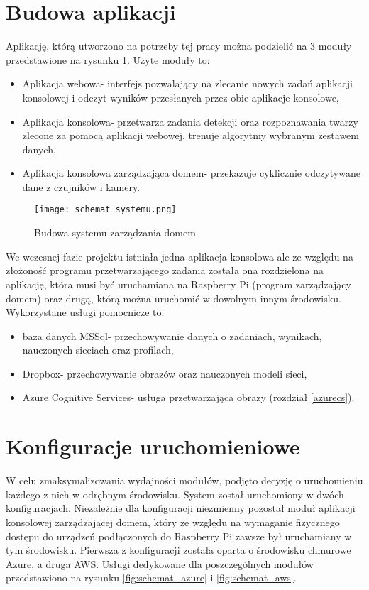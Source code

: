 \section{Budowa aplikacji}
Aplikację, którą utworzono na potrzeby tej pracy można podzielić na 3 moduły przedstawione na rysunku \ref{fig:schemat_systemu}. Użyte moduły to:
\begin{itemize}
\item Aplikacja webowa- interfejs pozwalający na zlecanie nowych zadań aplikacji konsolowej i odczyt wyników przesłanych przez obie aplikacje konsolowe,
\item Aplikacja konsolowa- przetwarza zadania detekcji oraz rozpoznawania twarzy zlecone za pomocą aplikacji webowej, trenuje algorytmy wybranym zestawem danych,
\item Aplikacja konsolowa zarządzająca domem- przekazuje cyklicznie odczytywane dane z czujników i kamery.
\end{itemize}
\begin{figure}[H]
	\centering
	\texttt{[image: schemat\_systemu.png]}
	\caption{Budowa systemu zarządzania domem}
	\label{fig:schemat_systemu}
\end{figure}
We wczesnej fazie projektu istniała jedna aplikacja konsolowa ale ze względu na złożoność programu przetwarzającego zadania została ona rozdzielona na aplikację, która musi być uruchamiana na Raspberry Pi (program zarządzający domem) oraz drugą, którą można uruchomić w dowolnym innym środowisku. Wykorzystane usługi pomocnicze to:
\begin{itemize}
\item baza danych MSSql- przechowywanie danych o zadaniach, wynikach, nauczonych sieciach oraz profilach,
\item Dropbox- przechowywanie obrazów oraz nauczonych modeli sieci,
\item Azure Cognitive Services- usługa przetwarzająca obrazy (rozdział \ref{azurecs}).
\end{itemize}

\section{Konfiguracje uruchomieniowe}
W celu zmaksymalizowania wydajności modułów, podjęto decyzję o uruchomieniu każdego z nich w odrębnym środowisku. System został uruchomiony w dwóch konfiguracjach. Niezależnie dla konfiguracji niezmienny pozostał moduł aplikacji konsolowej zarządzającej domem, który ze względu na wymaganie fizycznego dostępu do urządzeń podłączonych do Raspberry Pi zawsze był uruchamiany w tym środowisku.
Pierwsza z konfiguracji została oparta o środowisku chmurowe Azure, a druga AWS. Usługi dedykowane dla poszczególnych modułów przedstawiono na rysunku \ref{fig:schemat_azure} i \ref{fig:schemat_aws}.

